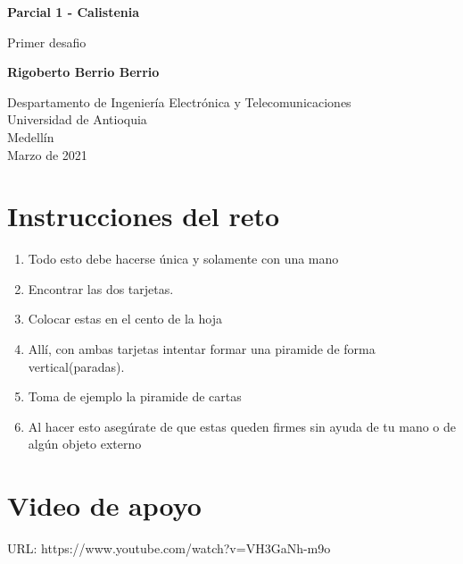 \documentclass{article}
\begin{document}
\begin{titlepage}
    \begin{center}
        \vspace*{1cm}
            
        \Huge
        \textbf{Parcial 1 - Calistenia}
            
        \vspace{0.5cm}
        \LARGE
        Primer desafio
            
        \vspace{1.5cm}
            
        \textbf{Rigoberto Berrio Berrio}
            
        \vfill
            
        \vspace{0.8cm}
            
        \Large
        Despartamento de Ingeniería Electrónica y Telecomunicaciones\\
        Universidad de Antioquia\\
        Medellín\\
        Marzo de 2021
            
    \end{center}
\end{titlepage}

\tableofcontents
\newpage
\section{Instrucciones del reto}\label{intro}
\begin{enumerate}
    \item Todo esto debe hacerse única y solamente con una mano
    \item Encontrar las dos tarjetas.
    \item Colocar estas en el cento de la hoja
    \item Allí, con ambas tarjetas intentar formar una piramide de forma vertical(paradas).
    \item Toma de ejemplo la piramide de cartas
    \item Al hacer esto asegúrate de que estas queden firmes sin ayuda de tu mano o de algún objeto externo
\end{enumerate}

\section{Video de apoyo} \label{contenido}
URL: https://www.youtube.com/watch?v=VH3GaNh-m9o
\end{document}
